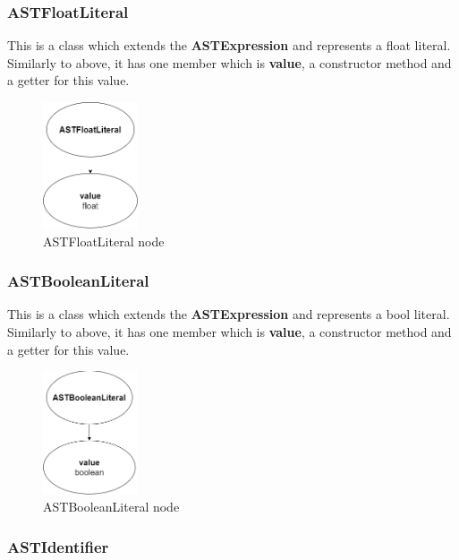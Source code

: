 \documentclass{article}
\begin{document}
					\subsubsection{ASTFloatLiteral}
					
					This is a class which extends the \textbf{ASTExpression} and represents a float literal. Similarly to above, it has one member which is \textbf{value}, a constructor method and a getter for this value.		
					
									\begin{figure}[H]
					\centering
			 			\includegraphics[width=0.25\textwidth]{astfloatlit.png}
			  			\caption{ASTFloatLiteral node}
			  			\label{fig:astfloatlit}
					\end{figure}
					
					\subsubsection{ASTBooleanLiteral}
					
					This is a class which extends the \textbf{ASTExpression} and represents a bool literal. Similarly to above, it has one member which is \textbf{value}, a constructor method and a getter for this value.		
					
									\begin{figure}[H]
					\centering
			 			\includegraphics[width=0.25\textwidth]{astbooleanlit.png}
			  			\caption{ASTBooleanLiteral node}
			  			\label{fig:astbooleanlit}
					\end{figure}
					
					\subsubsection{ASTIdentifier}
					
\end{document}
